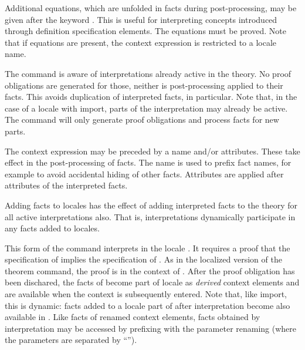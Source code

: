\begin{isabellebody}
\begin{isamarkuptext}
\begin{descr}
  Additional equations, which are unfolded in facts during
  post-processing, may be given after the keyword \hyperlink{keyword.where}{\mbox{}}.
  This is useful for interpreting concepts introduced through
  definition specification elements.  The equations must be proved.
  Note that if equations are present, the context expression is
  restricted to a locale name.

  The command is aware of interpretations already active in the
  theory.  No proof obligations are generated for those, neither is
  post-processing applied to their facts.  This avoids duplication of
  interpreted facts, in particular.  Note that, in the case of a
  locale with import, parts of the interpretation may already be
  active.  The command will only generate proof obligations and
  process facts for new parts.

  The context expression may be preceded by a name and/or attributes.
  These take effect in the post-processing of facts.  The name is used
  to prefix fact names, for example to avoid accidental hiding of
  other facts.  Attributes are applied after attributes of the
  interpreted facts.

  Adding facts to locales has the effect of adding interpreted facts
  to the theory for all active interpretations also.  That is,
  interpretations dynamically participate in any facts added to
  locales.

  \item [\hyperlink{command.interpretation}{\mbox{\isa{\isacommand{interpretation}}}}~\isa{{\isachardoublequote}name\ {\isasymsubseteq}\ expr{\isachardoublequote}}]

  This form of the command interprets  in the locale
  .  It requires a proof that the specification of  implies the specification of .  As in the
  localized version of the theorem command, the proof is in the
  context of .  After the proof obligation has been
  dischared, the facts of  become part of locale  as \emph{derived} context elements and are available when the
  context  is subsequently entered.  Note that, like
  import, this is dynamic: facts added to a locale part of  after interpretation become also available in .
  Like facts of renamed context elements, facts obtained by
  interpretation may be accessed by prefixing with the parameter
  renaming (where the parameters are separated by ``\isa{{\isacharunderscore}}'').


\end{descr}
\end{isamarkuptext}
\end{isabellebody}
